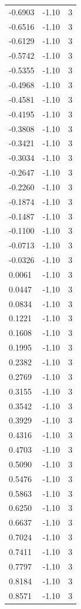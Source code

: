 \begin{longtable}{lrr}
  -0.6903 & -1.10 & 3 \\
  -0.6516 & -1.10 & 3 \\
  -0.6129 & -1.10 & 3 \\
  -0.5742 & -1.10 & 3 \\
  -0.5355 & -1.10 & 3 \\
  -0.4968 & -1.10 & 3 \\
  -0.4581 & -1.10 & 3 \\
  -0.4195 & -1.10 & 3 \\
  -0.3808 & -1.10 & 3 \\
  -0.3421 & -1.10 & 3 \\
  -0.3034 & -1.10 & 3 \\
  -0.2647 & -1.10 & 3 \\
  -0.2260 & -1.10 & 3 \\
  -0.1874 & -1.10 & 3 \\
  -0.1487 & -1.10 & 3 \\
  -0.1100 & -1.10 & 3 \\
  -0.0713 & -1.10 & 3 \\
  -0.0326 & -1.10 & 3 \\
  0.0061 & -1.10 & 3 \\
  0.0447 & -1.10 & 3 \\
  0.0834 & -1.10 & 3 \\
  0.1221 & -1.10 & 3 \\
  0.1608 & -1.10 & 3 \\
  0.1995 & -1.10 & 3 \\
  0.2382 & -1.10 & 3 \\
  0.2769 & -1.10 & 3 \\
  0.3155 & -1.10 & 3 \\
  0.3542 & -1.10 & 3 \\
  0.3929 & -1.10 & 3 \\
  0.4316 & -1.10 & 3 \\
  0.4703 & -1.10 & 3 \\
  0.5090 & -1.10 & 3 \\
  0.5476 & -1.10 & 3 \\
  0.5863 & -1.10 & 3 \\
  0.6250 & -1.10 & 3 \\
  0.6637 & -1.10 & 3 \\
  0.7024 & -1.10 & 3 \\
  0.7411 & -1.10 & 3 \\
  0.7797 & -1.10 & 3 \\
  0.8184 & -1.10 & 3 \\
  0.8571 & -1.10 & 3 \\

\end{longtable}
